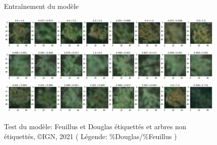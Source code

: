 \documentclass{article}
\begin{document}
		\begin{figure}[!h]
			\caption{Entraînement du modèle}
		\end{figure}
		\begin{figure}
			\includegraphics[scale=0.4]{res3.png}
			\includegraphics[scale=0.4]{res4.png}
			\includegraphics[scale=0.4]{res5.png}
			\caption{Test du modèle: Feuillus et Douglas étiquettés et arbres non étiquettés, \copyright IGN, 2021 ( Légende: \%Douglas/\%Feuillus )}
		\end{figure}
\end{document}
